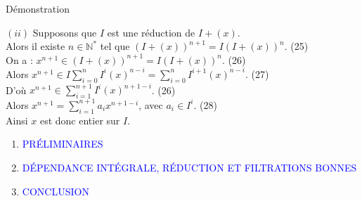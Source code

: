 \documentclass[11pt,a4paper]{beamer}
\begin{document}
	
					\begin{frame}{Démonstration}
		\begin{block}{}
				$(ii)$ Supposons que $I$ est une réduction de $I + (x)$.\\
			Alors il existe $ n \in \mathbb{N^*}$ tel que $(I + (x))^{n+1} = I(I + (x))^{n}$. (25)\\
			On a : $x^{n+1} \in (I + (x))^{n+1} = I(I + (x))^{n}$. (26)\\Alors $x^{n+1} \in I\displaystyle \sum_{i=0}^{n}{I^i (x)^{n-i}} = \displaystyle \sum_{i=0}^{n}{I^{i+1} (x)^{n-i}}$. (27)\\
			D'où $x^{n+1} \in \displaystyle \sum_{i=1}^{n+1}{I^i (x)^{n+1-i}}$. (26)\\ Alors $ x^{n+1} =  \displaystyle \sum_{i=1}^{n+1}{a_i x^{n+1-i}}$, avec $a_i \in I^i$. (28)\\ Ainsi $x$ est donc entier sur $I$.
		\end{block}
	\end{frame}
	
	
	
	
	\begin{frame}
		\begin{enumerate}
			\item<0> \textcolor{blue}{PRÉLIMINAIRES}\\
			\item<1> \textcolor{blue}{DÉPENDANCE INTÉGRALE, RÉDUCTION ET FILTRATIONS BONNES }\\
			\item<0> \textcolor{blue}{CONCLUSION}\\
		\end{enumerate}
	\end{frame}
	
\end{document}
